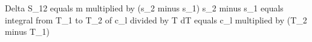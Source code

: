 Delta S_12 equals m multiplied by (s_2 minus s_1)  
s_2 minus s_1 equals integral from T_1 to T_2 of c_l divided by T dT equals c_l multiplied by (T_2 minus T_1)